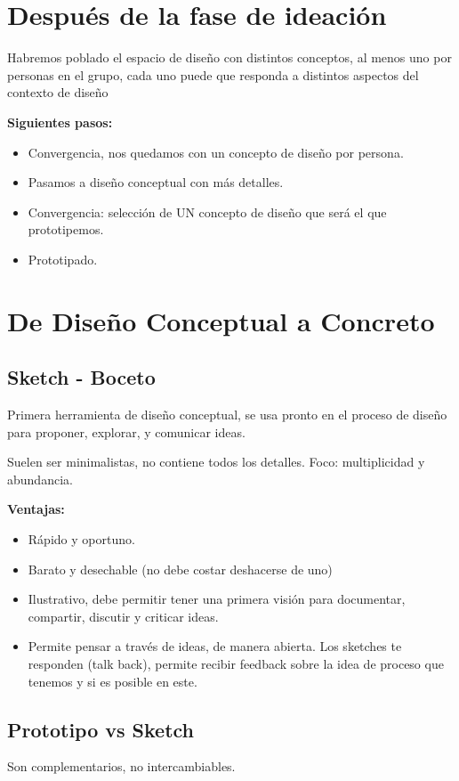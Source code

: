 \documentclass[12pt, twoside, openright]{report} %
\begin{document}
\section{Después de la fase de ideación}

Habremos poblado el espacio de diseño con distintos conceptos, al menos uno por personas en el grupo, cada uno puede que responda a distintos aspectos del contexto de diseño

\textbf{Siguientes pasos:}
\begin{itemize}
	\item Convergencia, nos quedamos con un concepto de diseño por persona.
	\item Pasamos a diseño conceptual con más detalles.
	\item Convergencia: selección de UN concepto de diseño que será el que prototipemos.
	\item Prototipado.
\end{itemize}

\section{De Diseño Conceptual a Concreto}
\subsection{Sketch - Boceto}
Primera herramienta de diseño conceptual, se usa pronto en el proceso de diseño para proponer, explorar, y comunicar ideas.

Suelen ser minimalistas, no contiene todos los detalles. Foco: multiplicidad y abundancia.

\textbf{Ventajas:}
\begin{itemize}
	\item Rápido y oportuno.
	\item Barato y desechable (no debe costar deshacerse de uno)
	\item Ilustrativo, debe permitir tener una primera visión para documentar, compartir, discutir y criticar ideas.
	\item Permite pensar a través de ideas, de manera abierta. Los sketches te responden (talk back), permite recibir feedback sobre la idea de proceso que tenemos y si es posible en este.
\end{itemize}

\subsection{Prototipo vs Sketch}
Son complementarios, no intercambiables.
\end{document}
